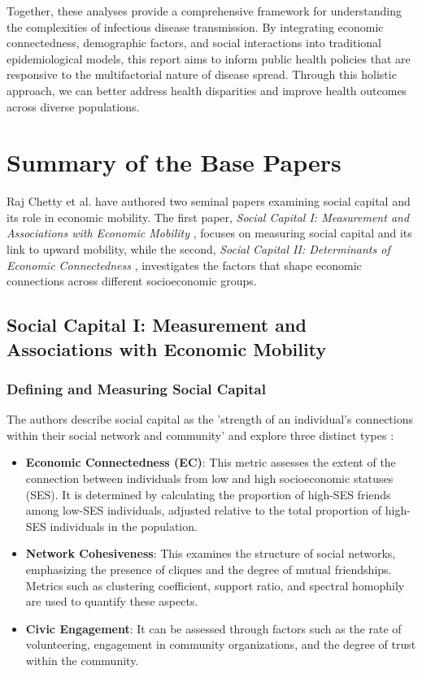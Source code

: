 \documentclass[9 pt]{article} %
\begin{document}
Together, these analyses provide a comprehensive framework for understanding the complexities of infectious disease transmission. By integrating economic connectedness, demographic factors, and social interactions into traditional epidemiological models, this report aims to inform public health policies that are responsive to the multifactorial nature of disease spread. Through this holistic approach, we can better address health disparities and improve health outcomes across diverse populations.

\section{Summary of the Base Papers}
Raj Chetty et al. have authored two seminal papers examining social capital and its role in economic mobility. The first paper, \textit{Social Capital I: Measurement and Associations with Economic Mobility} \cite{chetty2022social}, focuses on measuring social capital and its link to upward mobility, while the second, \textit{Social Capital II: Determinants of Economic Connectedness} \cite{chetty2022social2}, investigates the factors that shape economic connections across different socioeconomic groups.

\subsection{Social Capital I: Measurement and Associations with Economic Mobility}
\subsubsection*{Defining and Measuring Social Capital}
The authors describe social capital as the 'strength of an individual's connections within their social network and community' and explore three distinct types \cite{chetty2022social}:

\begin{itemize}
    \item \textbf{Economic Connectedness (EC)}: This metric assesses the extent of the connection between individuals from low and high socioeconomic statuses (SES). It is determined by calculating the proportion of high-SES friends among low-SES individuals, adjusted relative to the total proportion of high-SES individuals in the population.
    \item \textbf{Network Cohesiveness}: This examines the structure of social networks, emphasizing the presence of cliques and the degree of mutual friendships. Metrics such as clustering coefficient, support ratio, and spectral homophily are used to quantify these aspects.
    \item \textbf{Civic Engagement}: It can be assessed through factors such as the rate of volunteering, engagement in community organizations, and the degree of trust within the community.
\end{itemize}
\end{document}
